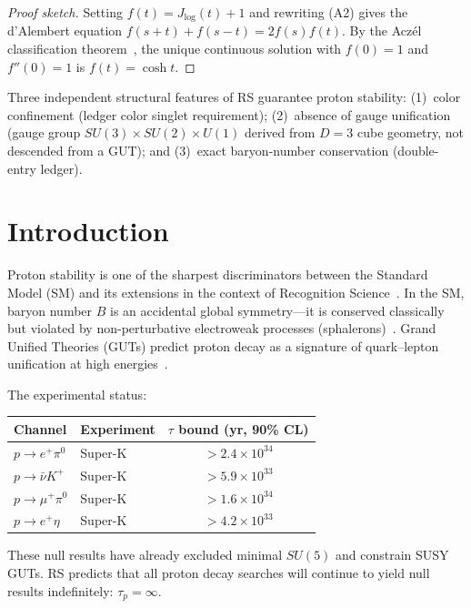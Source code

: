 \documentclass[12pt,a4paper]{article}
\theoremstyle{definition}
\theoremstyle{remark}
\begin{document}
\begin{proof}[Proof sketch]
Setting $f(t) = J_{\log}(t) + 1$ and rewriting \textup{(A2)} gives the
d'Alembert equation $f(s+t) + f(s-t) = 2f(s)f(t)$.  By the Acz\'el
classification theorem~\cite{Aczel1966}, the unique continuous solution
with $f(0) = 1$ and $f''(0) = 1$ is $f(t) = \cosh t$.
\end{proof}

\noindent Three independent structural features of RS guarantee proton
stability: (1)~color confinement (ledger color singlet requirement);
(2)~absence of gauge unification (gauge group $SU(3)\times SU(2)\times U(1)$
derived from $D=3$ cube geometry, not descended from a GUT); and
(3)~exact baryon-number conservation (double-entry ledger).

\section{Introduction}
\label{sec:intro}

Proton stability is one of the sharpest discriminators
between the Standard Model (SM) and its extensions in the
context of Recognition Science~\cite{RS_Axioms}.  In the
SM, baryon number $B$ is an accidental global symmetry---it
is conserved classically but violated by non-perturbative
electroweak processes (sphalerons)~\cite{tHooft1976}.  Grand
Unified Theories (GUTs) predict proton decay as a signature
of quark--lepton unification at high
energies~\cite{GeorgiGlashow1974}.

The experimental status:
\begin{center}
\renewcommand{\arraystretch}{1.3}
\begin{tabular}{@{}llc@{}}
\toprule
\textbf{Channel} & \textbf{Experiment} &
\textbf{$\tau$ bound (yr, 90\% CL)} \\
\midrule
$p \to e^+\pi^0$ & Super-K~\cite{SK2024}
& $> 2.4 \times 10^{34}$ \\
$p \to \bar{\nu} K^+$ & Super-K
& $> 5.9 \times 10^{33}$ \\
$p \to \mu^+\pi^0$ & Super-K
& $> 1.6 \times 10^{34}$ \\
$p \to e^+\eta$ & Super-K
& $> 4.2 \times 10^{33}$ \\
\bottomrule
\end{tabular}
\end{center}

These null results have already excluded minimal $SU(5)$
and constrain SUSY GUTs.  RS predicts that all proton
decay searches will continue to yield null results
indefinitely: $\tau_p = \infty$.
\end{document}

